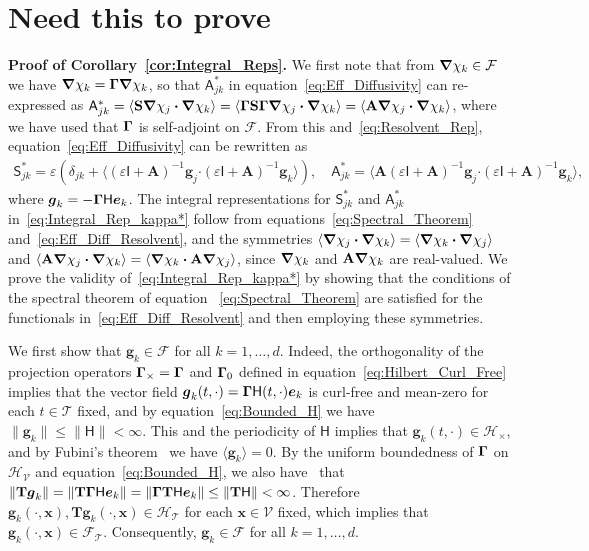 \documentclass[leqno,onefignum,onetabnum]{siamltex1213}
\newcommand{\corref}[1]{Corollary~\ref{#1}}
\newcommand{\Tb}{\mathbf{T}}
\newcommand{\Sb}{\mathbf{S}}
\newcommand{\Ab}{\mathbf{A}}
\newcommand{\Tc}{\mathcal{T}}
\newcommand{\Vc}{\mathcal{V}}
\newcommand{\Hc}{\mathcal{H}}
\newcommand{\Fc}{\mathcal{F}}
\newcommand{\Hm}{\mathsf{H}}
\newcommand{\Sm}{\mathsf{S}}
\newcommand{\Am}{\mathsf{A}}
\newcommand{\Ib}{\mathsf{I}}
\newcommand\bGamma{\mbox{\boldmath${\Gamma}$}}
\newcommand\bnabla{\mbox{\boldmath${\nabla}$}}
\providecommand\bcdot{\boldsymbol{\cdot}}
\newcommand{\vecg}{\boldsymbol{g}}
\newcommand{\vecx}{\boldsymbol{x}}
\newcommand{\vece}{\boldsymbol{e}}
\begin{document}
\section{Need this to prove}

\textbf{Proof of \corref{cor:Integral_Reps}.}\hspace{1ex}
%
We first note that from $\bnabla \chi_k\in\Fc$ we have 
$\bnabla \chi_k=\bGamma\bnabla \chi_k$, so that $\Am^*_{jk}$ in
equation~\eqref{eq:Eff_Diffusivity} can re-expressed as 
$\Am^*_{jk}=\langle\Sb\bnabla \chi_j\bcdot\bnabla \chi_k\rangle=\langle\bGamma\Sb\bGamma\bnabla \chi_j\bcdot\bnabla \chi_k\rangle  
=\langle\Ab\bnabla \chi_j\bcdot\bnabla \chi_k\rangle$, where we have used that $\bGamma$ is
self-adjoint on $\Fc$. From this and~\eqref{eq:Resolvent_Rep},
equation~\eqref{eq:Eff_Diffusivity} can be rewritten as
%
\begin{align}%
 \Sm^*_{jk}=\varepsilon\left(\delta_{jk}+\langle(\varepsilon\Ib+\Ab)^{-1}\vecg_j\bcdot(\varepsilon\Ib+\Ab)^{-1}\vecg_k\rangle\right), \quad
 \Am^*_{jk}=\langle\Ab(\varepsilon\Ib+\Ab)^{-1}\vecg_j\bcdot(\varepsilon\Ib+\Ab)^{-1}\vecg_k\rangle,
\end{align}
%
where $\vecg_k=-\bGamma\Hm\vece _k$. The integral representations
for $\Sm^*_{jk}$ and $\Am^*_{jk}$ in~\eqref{eq:Integral_Rep_kappa*} follow
from equations~\eqref{eq:Spectral_Theorem}
and~\eqref{eq:Eff_Diff_Resolvent}, and the symmetries 
$\langle\bnabla \chi_j\bcdot\bnabla \chi_k\rangle=\langle\bnabla \chi_k\bcdot\bnabla \chi_j\rangle$ and 
$\langle\Ab\bnabla \chi_j\bcdot\bnabla \chi_k\rangle=\langle\bnabla \chi_k\bcdot\Ab\bnabla \chi_j\rangle$, since
$\bnabla \chi_k$ and $\Ab\bnabla \chi_k$ are real-valued. We prove the
validity of~\eqref{eq:Integral_Rep_kappa*} by showing that the
conditions of the spectral theorem of equation
~\eqref{eq:Spectral_Theorem} are satisfied for the functionals
in~\eqref{eq:Eff_Diff_Resolvent} and then employing these symmetries.     





We first show that $\vecg_k\in\Fc$ for
all $k=1,\ldots,d$. Indeed, the orthogonality of the
projection operators $\bGamma_\times=\bGamma$ and $\bGamma_0$ defined in
equation~\eqref{eq:Hilbert_Curl_Free} implies that the vector field
$\vecg_k(t,\cdot)=\bGamma\Hm(t,\cdot)\vece _k$ is curl-free and mean-zero
for each $t\in\Tc$ fixed, and by equation~\eqref{eq:Bounded_H} 
we have $\|\vecg_k\|\leq\|\Hm\|<\infty$. This and the periodicity of $\Hm$ implies
that $\vecg_k(t,\cdot)\in\Hc_\times$, and by Fubini's theorem~\cite{Folland:99:RealAnalysis}
we have $\langle\vecg_k\rangle=0$.  By the uniform boundedness of $\bGamma$ on
$\Hc_{\Vc}$ and equation~\eqref{eq:Bounded_H}, we also
have~\cite{Folland:99:RealAnalysis} that 
$\|\Tb\vecg_k\|=\|\Tb\bGamma\Hm\vece _k\|=\|\bGamma\Tb\Hm\vece _k\|\leq\|\Tb\Hm\|<\infty$.   
Therefore $\vecg_k(\cdot,\vecx),\Tb\vecg_k(\cdot,\vecx)\in\Hc_{\Tc}$ for each
$\vecx\in\Vc$ fixed, which implies that
$\vecg_k(\cdot,\vecx)\in\Fc_{\Tc}$. Consequently,  $\vecg_k\in\Fc$ for
all $k=1,\ldots,d$.
\end{document}
